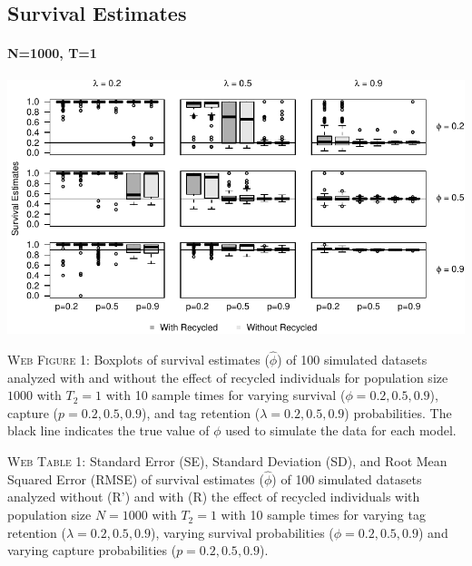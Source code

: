 \documentclass[]{article}
\let\oldparagraph\paragraph
\renewcommand{\paragraph}[1]{\oldparagraph{#1}\mbox{}}
\begin{document}
\newpage 

\subsection{Survival Estimates}\label{survival-estimates}

\paragraph{N=1000, T=1}\label{n1000-t1}

\includegraphics{Appendix_BW_files/figure-latex/figure1_survival_GJSTL1-1.pdf}

\textsc{Web Figure 1:} Boxplots of survival estimates (\(\hat{\phi}\))
of 100 simulated datasets analyzed with and without the effect of
recycled individuals for population size \(1000\) with \(T_2=1\) with 10
sample times for varying survival (\(\phi=0.2,0.5,0.9\)), capture
(\(p=0.2,0.5,0.9\)), and tag retention (\(\lambda=0.2,0.5,0.9\))
probabilities. The black line indicates the true value of \(\phi\) used
to simulate the data for each model.

\textsc{Web Table 1:} Standard Error (SE), Standard Deviation (SD), and
Root Mean Squared Error (RMSE) of survival estimates (\(\hat{\phi}\)) of
100 simulated datasets analyzed without (R') and with (R) the effect of
recycled individuals with population size \(N=1000\) with \(T_2=1\) with
10 sample times for varying tag retention (\(\lambda=0.2,0.5,0.9\)),
varying survival probabilities (\(\phi=0.2,0.5,0.9\)) and varying
capture probabilities (\(p=0.2,0.5,0.9\)).
\end{document}
